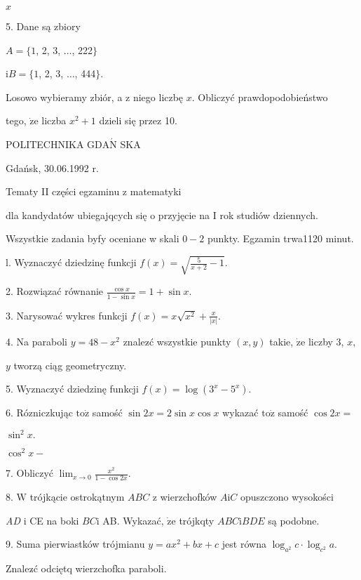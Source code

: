 \documentclass[a4paper,12pt]{article}
\begin{document}
$x$

5. Dane są zbiory

$A=\{1$, 2, 3, $\ldots$, 222$\}$

$\mathrm{i} B=\{1$, 2, 3, $\ldots$, 444$\}.$

Losowo wybieramy zbiór, a z niego liczbę $x$. Obliczyć prawdopodobieństwo

tego, $\dot{\mathrm{z}}\mathrm{e}$ liczba $x^{2}+1$ dzieli się przez 10.




POLITECHNIKA $\mathrm{G}\mathrm{D}\mathrm{A}\acute{\mathrm{N}}$ SKA

Gdańsk, 30.06.1992 r.

Tematy II części egzaminu z matematyki

dla kandydatów ubiegajqcych się o przyjęcie na I rok studiów dziennych.

Wszystkie zadania byfy oceniane w skali $0-2$ punkty. Egzamin trwa1120 minut.

l. Wyznaczyć dziedzinę funkcji $f(x)=\sqrt{\frac{5}{x+2}-1}.$

2. Rozwiązać równanie $\displaystyle \frac{\cos x}{1-\sin x}=1+\sin x.$

3. Narysować wykres funkcji $f(x)=x\displaystyle \sqrt{x^{2}}+\frac{x}{|x|}.$

4. Na paraboli $y=48-x^{2}$ znalez$\acute{}$ć wszystkie punkty $(x,y)$ takie, $\dot{\mathrm{z}}\mathrm{e}$ liczby 3, $x,$

$y$ tworzą ciąg geometryczny.

5. Wyznaczyć dziedzinę funkcji $f(x)=\log(3^{x}-5^{x}).$

6. Rózniczkując $\mathrm{t}\mathrm{o}\dot{\mathrm{z}}$ samość $\sin 2x=2\sin x\cos x$ wykazać $\mathrm{t}\mathrm{o}\dot{\mathrm{z}}$ samość $\cos 2x=$

$\sin^{2}x.$

$\cos^{2}x-$

7. Obliczyć $\displaystyle \lim_{x\rightarrow 0}\frac{x^{2}}{1-\cos 2x}.$

8. $\mathrm{W}$ trójkącie ostrokątnym $ABC$ z wierzchofków $A\mathrm{i}C$ opuszczono wysokości

{\it AD} $\mathrm{i}$ CE na boki $BC\mathrm{i}$ AB. Wykazać, $\dot{\mathrm{z}}\mathrm{e}$ trójkqty $ABC\mathrm{i}BDE$ są podobne.

9. Suma pierwiastków trójmianu $y = ax^{2}+bx+c$ jest równa $\log_{a^{2}}c\cdot\log_{c^{2}}a.$

Znalez$\acute{}$ć odciętq wierzchofka paraboli.
\end{document}
